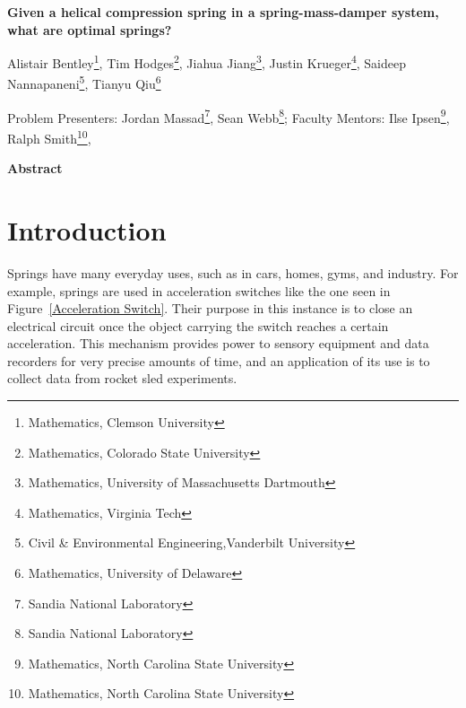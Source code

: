 \documentclass[10pt]{article}
\begin{document}
\centerline{\large \bf Given a helical compression spring in a spring-mass-damper system, what are optimal springs?}

\vspace{.1truein}

\def\thefootnote{\arabic{footnote}}
\begin{center}
  
  Alistair Bentley\footnote{Mathematics, Clemson University},
   Tim Hodges\footnote{Mathematics, Colorado State University},
   Jiahua Jiang\footnote{Mathematics, University of Massachusetts Dartmouth },
  Justin Krueger\footnote{Mathematics, Virginia Tech},
  Saideep Nannapaneni\footnote{Civil \& Environmental Engineering,Vanderbilt University},
  Tianyu Qiu\footnote{Mathematics, University of Delaware}
   
\end{center}



\begin{center}
Problem Presenters: Jordan Massad\footnote{Sandia National Laboratory},
Sean Webb\footnote{Sandia National Laboratory};
	Faculty Mentors: Ilse Ipsen\footnote{Mathematics, North Carolina State University},
	Ralph Smith\footnote{Mathematics, North Carolina State University}, 
\end{center}


\vspace{.3truein}
\centerline{\bf Abstract}





\section{Introduction}
\label{sec:Introduction}

Springs have many everyday uses, such as in cars, homes, gyms, and industry. For example, springs are used in acceleration switches like the one seen in Figure~\ref{Acceleration Switch}. Their purpose in this instance is to close an electrical circuit once the object carrying the switch reaches a certain acceleration. This mechanism provides power to sensory equipment and data recorders for very precise amounts of time, and an application of its use is to collect data from rocket sled experiments. 
\end{document}
